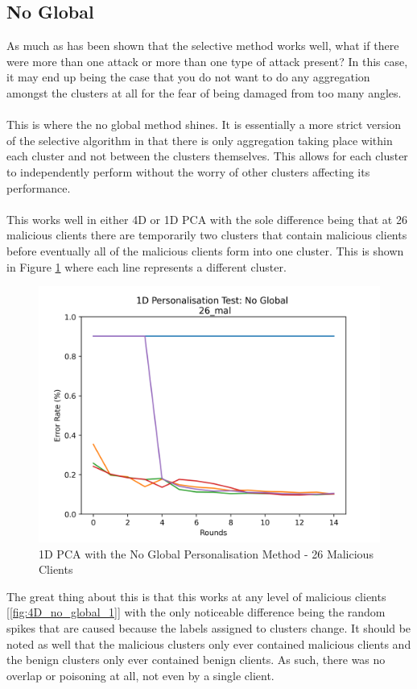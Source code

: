 \subsection{No Global}
As much as has been shown that the selective method works well, what if there were more than one attack or more than one type of attack present?
In this case, it may end up being the case that you do not want to do any aggregation amongst the clusters at all for the fear of being damaged from too many angles.
\\ \\
This is where the no global method shines.
It is essentially a more strict version of the selective algorithm in that there is only aggregation taking place within each cluster and not between the clusters themselves.
This allows for each cluster to independently perform without the worry of other clusters affecting its performance.
\\ \\
This works well in either 4D or 1D PCA with the sole difference being that at 26 malicious clients there are temporarily two clusters that contain malicious clients before eventually all of the malicious clients form into one cluster.
This is shown in Figure \ref{fig:1D_no_global} where each line represents a different cluster.
\begin{figure}[htbp]
	\centering
    \includegraphics[scale=0.5]{my_agg/graphs/1d_no_global.png}
    \caption{1D PCA with the No Global Personalisation Method - 26 Malicious Clients}
	\label{fig:1D_no_global}
\end{figure}
The great thing about this is that this works at any level of malicious clients [\ref{fig:4D_no_global_1}] with the only noticeable difference being the random spikes that are caused because the labels assigned to clusters change.
It should be noted as well that the malicious clusters only ever contained malicious clients and the benign clusters only ever contained benign clients.
As such, there was no overlap or poisoning at all, not even by a single client.

